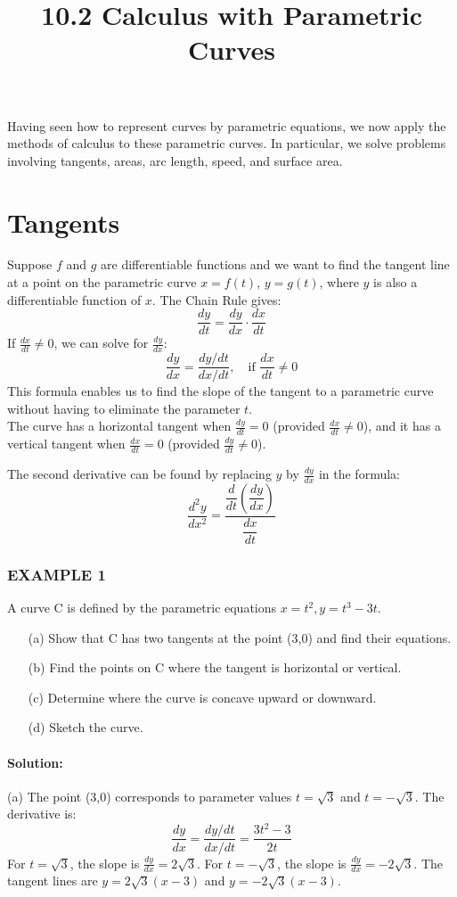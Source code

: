 \documentclass{article}
\title{10.2 Calculus with Parametric Curves}
\date{}
\author{}
\begin{document}
\maketitle


Having seen how to represent curves by parametric equations, we now apply the methods of calculus to these parametric curves. In particular, we solve problems involving tangents, areas, arc length, speed, and surface area.

\section*{Tangents}
Suppose $f$ and $g$ are differentiable functions and we want to find the tangent line at a point on the parametric curve $x=f(t)$, $y=g(t)$, where $y$ is also a differentiable function of $x$. The Chain Rule gives:
\[
\frac{dy}{dt} = \frac{dy}{dx} \cdot \frac{dx}{dt}
\]
If $\frac{dx}{dt} \neq 0$, we can solve for $\frac{dy}{dx}$:
\[
\frac{dy}{dx} = \frac{dy/dt}{dx/dt}, \quad \text{if } \frac{dx}{dt} \neq 0
\]
This formula enables us to find the slope of the tangent to a parametric curve without having to eliminate the parameter $t$. 
\\The curve has a horizontal tangent when $\frac{dy}{dt} = 0$ (provided $\frac{dx}{dt} \neq 0$), and it has a vertical tangent when $\frac{dx}{dt} = 0$ (provided $\frac{dy}{dt} \neq 0$).

The second derivative can be found by replacing $y$ by $\frac{dy}{dx}$ in the formula:
\[
\frac{d^2y}{dx^2} = {\dfrac{\dfrac{d}{dt}\left(\dfrac{dy}{dx}\right)}{\dfrac{dx}{dt}}}
\]

\subsubsection*{EXAMPLE 1}
A curve C is defined by the parametric equations $x=t^2, y=t^3-3t$.
\begin{enumerate}
    \item[(a)] Show that C has two tangents at the point (3,0) and find their equations.
    \item[(b)] Find the points on C where the tangent is horizontal or vertical.
    \item[(c)] Determine where the curve is concave upward or downward.
    \item[(d)] Sketch the curve.
\end{enumerate}

\paragraph{Solution:}
(a) The point (3,0) corresponds to parameter values $t=\sqrt{3}$ and $t=-\sqrt{3}$. The derivative is:
\[
\frac{dy}{dx} = \frac{dy/dt}{dx/dt} = \frac{3t^2-3}{2t}
\]
For $t=\sqrt{3}$, the slope is $\frac{dy}{dx} = 2\sqrt{3}$. For $t=-\sqrt{3}$, the slope is $\frac{dy}{dx} = -2\sqrt{3}$.
The tangent lines are $y = 2\sqrt{3}(x-3)$ and $y = -2\sqrt{3}(x-3)$.
\end{document}
